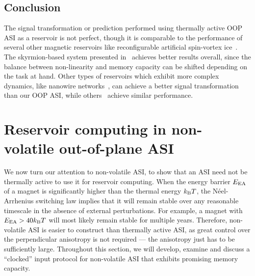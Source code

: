 \subsection{Conclusion}
The signal transformation or prediction performed using thermally active OOP ASI as a reservoir is not perfect, though it is comparable to the performance of several other magnetic reservoirs like reconfigurable artificial spin-vortex ice~\cite{gartside2022reconfigurable}.
The skyrmion-based system presented in~ achieves better results overall, since the balance between non-linearity and memory capacity can be shifted depending on the task at hand.
Other types of reservoirs which exhibit more complex dynamics, like nanowire networks~\cite{RC_NNN}, can achieve a better signal transformation than our OOP ASI, while others~\cite{NanoarchitectonicAtomicSwitch} achieve similar performance.


\newpage
\section{Reservoir computing in non-volatile out-of-plane ASI}
We now turn our attention to non-volatile ASI, to show that an ASI need not be thermally active to use it for reservoir computing.
When the energy barrier $E_\mathrm{EA}$ of a magnet is significantly higher than the thermal energy $\kBT$, the N\'eel-Arrhenius switching law implies that it will remain stable over any reasonable timescale in the absence of external perturbations.
For example, a magnet with $\EEA > 40 \kBT$ will most likely remain stable for multiple years.
Therefore, non-volatile ASI is easier to construct than thermally active ASI, as great control over the perpendicular anisotropy is not required --- the anisotropy just has to be sufficiently large.
Throughout this section, we will develop, examine and discuss a ``clocked'' input protocol for non-volatile ASI that exhibits promising memory capacity.

